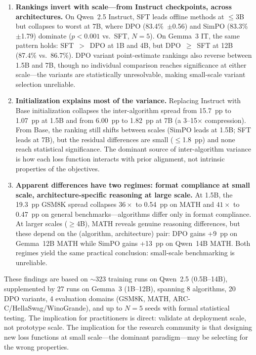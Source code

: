 \documentclass{article}
\begin{document}
\begin{enumerate}[leftmargin=*,itemsep=2pt]
    \item \textbf{Rankings invert with scale---from Instruct checkpoints, across architectures.}
    On Qwen~2.5 Instruct, SFT leads offline methods at $\leq$3B but collapses to worst at 7B, where DPO (83.4\%~$\pm$0.56) and SimPO (83.3\%~$\pm$1.79) dominate ($p < 0.001$ vs.\ SFT, $N{=}5$). On Gemma~3 IT, the same pattern holds: SFT~$>$~DPO at 1B and 4B, but DPO~$\geq$~SFT at 12B (87.4\% vs.\ 86.7\%). DPO variant point-estimate rankings also reverse between 1.5B and 7B, though no individual comparison reaches significance at either scale---the variants are statistically unresolvable, making small-scale variant selection unreliable.

    \item \textbf{Initialization explains most of the variance.}
    Replacing Instruct with Base initialization collapses the inter-algorithm spread from 15.7~pp to 1.07~pp at 1.5B and from 6.00~pp to 1.82~pp at 7B (a 3--15$\times$ compression). From Base, the ranking still shifts between scales (SimPO leads at 1.5B; SFT leads at 7B), but the residual differences are small ($\leq$1.8~pp) and none reach statistical significance. The dominant source of inter-algorithm variance is how each loss function interacts with prior alignment, not intrinsic properties of the objectives.

    \item \textbf{Apparent differences have two regimes: format compliance at small scale, architecture-specific reasoning at large scale.}
    At 1.5B, the 19.3~pp GSM8K spread collapses $36\times$ to 0.54~pp on MATH and $41\times$ to 0.47~pp on general benchmarks---algorithms differ only in format compliance. At larger scales ($\geq$4B), MATH reveals genuine reasoning differences, but these depend on the (algorithm, architecture) pair: DPO gains +9~pp on Gemma~12B MATH while SimPO gains +13~pp on Qwen~14B MATH. Both regimes yield the same practical conclusion: small-scale benchmarking is unreliable.
\end{enumerate}

These findings are based on ${\sim}$323 training runs on Qwen~2.5 (0.5B--14B), supplemented by 27 runs on Gemma~3 (1B--12B), spanning 8 algorithms, 20 DPO variants, 4 evaluation domains (GSM8K, MATH, ARC-C/HellaSwag/WinoGrande), and up to $N{=}5$ seeds with formal statistical testing.
The implication for practitioners is direct: validate at deployment scale, not prototype scale. The implication for the research community is that designing new loss functions at small scale---the dominant paradigm---may be selecting for the wrong properties.
\end{document}
